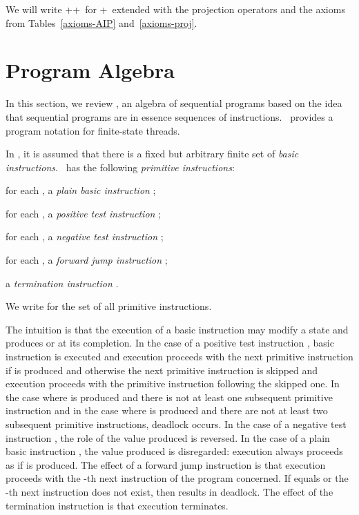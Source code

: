 \documentclass[fleqn]{llncs}
\begin{document}
We will write \BTA+\REC+\AIP\ for \BTA+\REC\ extended with the
projection operators and the axioms from Tables~\ref{axioms-AIP}
and~\ref{axioms-proj}.

\section{Program Algebra}
\label{sect-PGA}

In this section, we review \PGA, an algebra of sequential programs based
on the idea that sequential programs are in essence sequences of
instructions.
\PGA\ provides a program notation for finite-state threads.

In \PGA, it is assumed that there is a fixed but arbitrary finite set
 of \emph{basic instructions}.
\PGA\ has the following \emph{primitive instructions}:
\begin{iteml}
\item
for each , a \emph{plain basic instruction} ;
\item
for each , a \emph{positive test instruction} ;
\item
for each , a \emph{negative test instruction} ;
\item
for each , a \emph{forward jump instruction} ;
\item
a \emph{termination instruction} .
\end{iteml}
We write  for the set of all primitive instructions.

The intuition is that the execution of a basic instruction  may
modify a state and produces  or  at its completion.
In the case of a positive test instruction , basic instruction
 is executed and execution proceeds with the next primitive
instruction if  is produced and otherwise the next primitive
instruction is skipped and execution proceeds with the primitive
instruction following the skipped one.
In the case where  is produced and there is not at least one
subsequent primitive instruction and in the case where  is
produced and there are not at least two subsequent primitive
instructions, deadlock occurs.
In the case of a negative test instruction , the role of the
value produced is reversed.
In the case of a plain basic instruction , the value produced is
disregarded: execution always proceeds as if  is produced.
The effect of a forward jump instruction  is that execution
proceeds with the -th next instruction of the program concerned.
If  equals  or the -th next instruction does not exist, then
 results in deadlock.
The effect of the termination instruction  is that execution
terminates.
\end{document}
